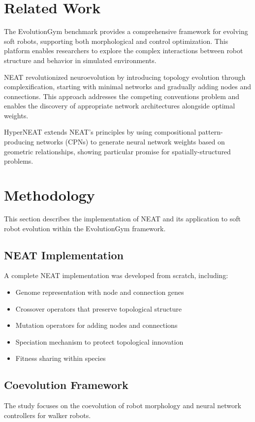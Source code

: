 \documentclass[conference]{IEEEtran}
\begin{document}
\section{Related Work}
The EvolutionGym benchmark \cite{evogym2021} provides a comprehensive framework for evolving soft robots, supporting both morphological and control optimization. This platform enables researchers to explore the complex interactions between robot structure and behavior in simulated environments.

NEAT \cite{stanley2002evolving} revolutionized neuroevolution by introducing topology evolution through complexification, starting with minimal networks and gradually adding nodes and connections. This approach addresses the competing conventions problem and enables the discovery of appropriate network architectures alongside optimal weights.

HyperNEAT \cite{stanley2009hypercube} extends NEAT's principles by using compositional pattern-producing networks (CPNs) to generate neural network weights based on geometric relationships, showing particular promise for spatially-structured problems.

\section{Methodology}
This section describes the implementation of NEAT and its application to soft robot evolution within the EvolutionGym framework.

\subsection{NEAT Implementation}
A complete NEAT implementation was developed from scratch, including:
\begin{itemize}
    \item Genome representation with node and connection genes
    \item Crossover operators that preserve topological structure
    \item Mutation operators for adding nodes and connections
    \item Speciation mechanism to protect topological innovation
    \item Fitness sharing within species
\end{itemize}

\subsection{Coevolution Framework}
The study focuses on the coevolution of robot morphology and neural network controllers for walker robots. 
\end{document}
